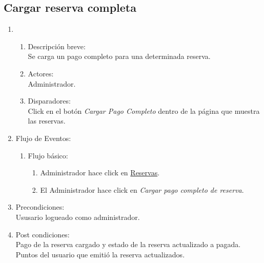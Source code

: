 \documentclass[a4paper,11pt]{article}
\begin{document}
\subsection{Cargar reserva completa}
\begin{enumerate}

    \item
    \begin{enumerate}
    \item Descripci\'on breve: \\
        Se carga un pago completo para una determinada reserva.
    \item Actores: \\
        Administrador.
    \item Disparadores: \\
        Click en el bot\'on \emph{Cargar Pago Completo} dentro de la p\'agina que muestra las reservas.
    \end{enumerate}

    \item Flujo de Eventos:

    \begin{enumerate}

        \item Flujo b\'asico:
	\begin{enumerate}
            \item Administrador hace click en \underline{Reservas}. 
	    \item El Administrador hace click en \emph{Cargar pago completo de reserva}.
	\end{enumerate}
    \end{enumerate}

    \item Precondiciones: \\
        Ususario logueado como administrador.

    \item Post condiciones: \\
        Pago de la reserva cargado y estado de la reserva actualizado a pagada.
        Puntos del usuario que emiti\'o la reserva actualizados.

\end{enumerate}


\end{document}
